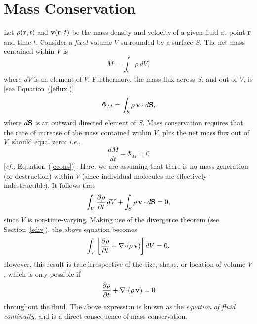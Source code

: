 \section{Mass Conservation}\label{scont}
Let $\rho({\bf r},t)$ and ${\bf v}({\bf r},t)$ be the mass density and velocity  of a given fluid at point ${\bf r}$ and time $t$. Consider a
{\em fixed}\/ volume $V$ surrounded by a surface $S$. The net mass contained within $V$ is
\begin{equation}
M = \int_V \rho\,dV,
\end{equation}
where $dV$ is an element of $V$.
Furthermore, the mass flux across $S$, and out of $V$, is [see Equation~(\ref{eflux})]
\begin{equation}
\Phi_M = \int_S \rho\,{\bf v}\cdot d{\bf S},
\end{equation}
where $d{\bf S}$ is an outward directed element of $S$.  Mass conservation requires 
that the rate of increase of the mass contained within $V$,
plus the net mass flux  out of $V$, should equal zero: {\em i.e.},
\begin{equation}
\frac{dM}{dt} +\Phi_M=0
\end{equation}
[{\em cf.}, Equation~(\ref{econs})].
Here, we are assuming that there is no  mass generation (or destruction) within $V$ (since individual molecules
are effectively indestructible). 
It follows that
\begin{equation}
\int_V \frac{\partial \rho}{\partial t}\,dV + \int_S\rho\,{\bf v}\cdot d{\bf S} = 0,
\end{equation}
since $V$ is non-time-varying. Making use of the divergence theorem (see Section~\ref{sdiv}),
the above equation becomes
\begin{equation}
\int_V\left[\frac{\partial \rho}{\partial t} + \nabla\!\cdot\!(\rho\,{\bf v})\right]dV = 0.
\end{equation}
However, this result is true irrespective of the size, shape, or location of  volume $V$, which is only possible if
\begin{equation}\label{e4.33}
\frac{\partial\rho}{\partial t} + \nabla\!\cdot\!(\rho\,{\bf v}) = 0
\end{equation}
throughout the fluid. The above expression is known as the {\em equation of fluid continuity}, and is
a direct consequence of mass conservation. 

